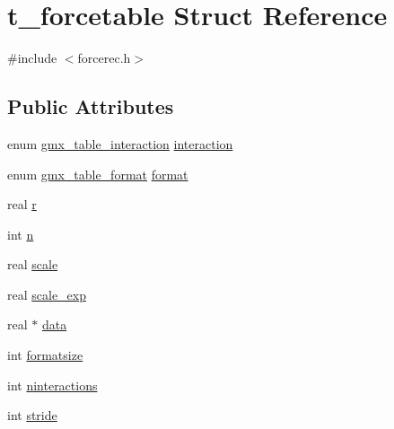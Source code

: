 \hypertarget{structt__forcetable}{\section{t\-\_\-forcetable \-Struct \-Reference}
\label{structt__forcetable}
}


{\ttfamily \#include $<$forcerec.\-h$>$}

\subsection*{\-Public \-Attributes}
\begin{DoxyCompactItemize}
\item 
enum \hyperlink{include_2types_2enums_8h_a08cae88a710dc5fa3a6175dfcf1d5772}{gmx\-\_\-table\-\_\-interaction} \hyperlink{structt__forcetable_a99f19dbd86d595a6a6fde0f8e4c7c314}{interaction}
\item 
enum \hyperlink{include_2types_2enums_8h_ad1a9a9ffd8243a5eaec6d6c969faeab2}{gmx\-\_\-table\-\_\-format} \hyperlink{structt__forcetable_a4a703e6575e55948b2ae0dbcddaa0f5c}{format}
\item 
real \hyperlink{structt__forcetable_abe799803c1b92fb8bb8007494eb78feb}{r}
\item 
int \hyperlink{structt__forcetable_a15b22391b981e3958f382bd5cdb05133}{n}
\item 
real \hyperlink{structt__forcetable_a74042b613c0660e9d1a66b49147d0159}{scale}
\item 
real \hyperlink{structt__forcetable_a93b8ebe429ad3ec762545c70113fcbc5}{scale\-\_\-exp}
\item 
real $\ast$ \hyperlink{structt__forcetable_a80eead30934f1822dc387f6de89390d9}{data}
\item 
int \hyperlink{structt__forcetable_ab6dd1173c15ab98586af99e29859161a}{formatsize}
\item 
int \hyperlink{structt__forcetable_af6ff5f87d9de25506105000425c5652f}{ninteractions}
\item 
int \hyperlink{structt__forcetable_a9432ad1dc64a5126fe8c9f18ac4de9b2}{stride}
\end{DoxyCompactItemize}


